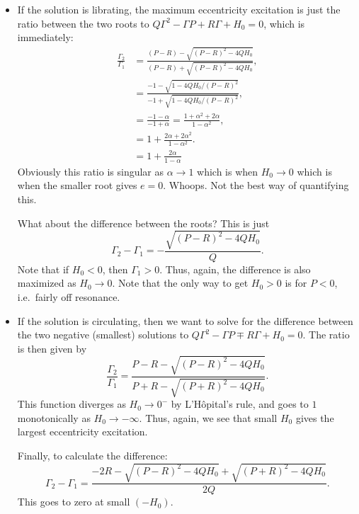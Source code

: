 \documentclass[10pt,
        usenames, %
        dvipsnames %
    ]{article}
\newcommand*{\p}[1]{\left(#1\right)}
\begin{document}
\begin{itemize}
    \item If the solution is librating, the maximum eccentricity excitation is
        just the ratio between the two roots to $Q\Gamma^2 -
        \Gamma P + R\Gamma + H_0 = 0$, which is immediately:
        \begin{align}
            \frac{\Gamma_2}{\Gamma_1} &= \frac{\p{P - R} - \sqrt{\p{P - R}^2 -
                4QH_0}}{\p{P - R} + \sqrt{\p{P - R}^2 - 4QH_0}},\\
                &= \frac{-1 - \sqrt{1 - 4QH_0 / (P - R)^2}}{
                    -1 + \sqrt{1 - 4QH_0 / (P - R)^2}},\\
                &= \frac{-1 - \alpha}{-1 + \alpha} = \frac{1 + \alpha^2 +
                    2\alpha}{1 - \alpha^2},\\
                &= 1 + \frac{2\alpha + 2\alpha^2}{1 - \alpha^2}.\\
                &= 1 + \frac{2\alpha}{1 - \alpha}
        \end{align}
        Obviously this ratio is singular as $\alpha \to 1$ which is when $H_0
        \to 0$ which is when the smaller root gives $e = 0$. Whoops. Not the
        best way of quantifying this.

        What about the difference between the roots? This is just
        \begin{equation}
            \Gamma_2 - \Gamma_1 = -\frac{\sqrt{(P - R)^2 - 4QH_0}}{Q}.
        \end{equation}
        Note that if $H_0 < 0$, then $\Gamma_1 > 0$. Thus, again, the difference
        is also maximized as $H_0 \to 0$. Note that the only way to get $H_0 >
        0$ is for $P < 0$, i.e.\ fairly off resonance.
    \item If the solution is circulating, then we want to solve for the
        difference between the two negative (smallest) solutions to $Q\Gamma^2 -
        \Gamma P \mp R\Gamma + H_0 = 0$. The ratio is then given by
        \begin{equation}
            \frac{\Gamma_2}{\Gamma_1} = \frac{P - R - \sqrt{\p{P - R}^2
                - 4QH_0}}{P + R - \sqrt{\p{P + R}^2 - 4QH_0}}.
        \end{equation}
        This function diverges as $H_0 \to 0^-$ by L'H\^opital's rule, and goes
        to $1$ monotonically as $H_0 \to -\infty$. Thus, again, we see that
        small $H_0$ gives the largest eccentricity excitation.

        Finally, to calculate the difference:
        \begin{equation}
            \Gamma_2 - \Gamma_1 = \frac{-2R - \sqrt{\p{P - R}^2 - 4QH_0}
                + \sqrt{\p{P + R}^2 - 4QH_0}}{2Q}.
        \end{equation}
        This goes to zero at small $(-H_0)$.
\end{itemize}
\end{document}
